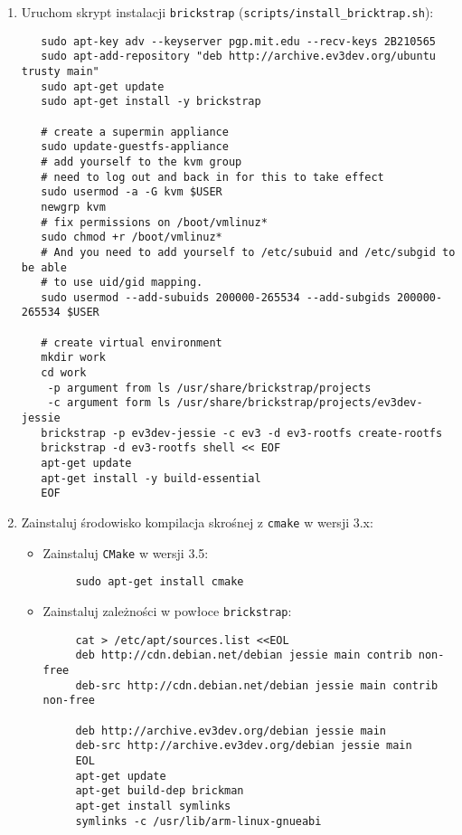 \documentclass{article}
\begin{document}
\begin{enumerate}
\def\labelenumi{\arabic{enumi}.}
\item
  Uruchom skrypt instalacji \texttt{brickstrap}
  (\texttt{scripts/install\_bricktrap.sh}):\\
  \begin{verbatim}
   sudo apt-key adv --keyserver pgp.mit.edu --recv-keys 2B210565
   sudo apt-add-repository "deb http://archive.ev3dev.org/ubuntu trusty main"
   sudo apt-get update
   sudo apt-get install -y brickstrap

   # create a supermin appliance
   sudo update-guestfs-appliance
   # add yourself to the kvm group
   # need to log out and back in for this to take effect
   sudo usermod -a -G kvm $USER
   newgrp kvm
   # fix permissions on /boot/vmlinuz*
   sudo chmod +r /boot/vmlinuz*
   # And you need to add yourself to /etc/subuid and /etc/subgid to be able
   # to use uid/gid mapping.
   sudo usermod --add-subuids 200000-265534 --add-subgids 200000-265534 $USER

   # create virtual environment
   mkdir work
   cd work
    -p argument from ls /usr/share/brickstrap/projects
    -c argument form ls /usr/share/brickstrap/projects/ev3dev-jessie
   brickstrap -p ev3dev-jessie -c ev3 -d ev3-rootfs create-rootfs
   brickstrap -d ev3-rootfs shell << EOF
   apt-get update
   apt-get install -y build-essential
   EOF
  \end{verbatim}
\item
  Zainstaluj środowisko kompilacja skrośnej z \texttt{cmake} w wersji
  3.x:
  \begin{itemize}
  \item
    Zainstaluj \texttt{CMake} w wersji 3.5:
    \begin{verbatim}
     sudo apt-get install cmake
    \end{verbatim}
\item Zainstaluj zależności w powłoce \texttt{brickstrap}:
    \begin{verbatim}
     cat > /etc/apt/sources.list <<EOL
     deb http://cdn.debian.net/debian jessie main contrib non-free
     deb-src http://cdn.debian.net/debian jessie main contrib non-free

     deb http://archive.ev3dev.org/debian jessie main
     deb-src http://archive.ev3dev.org/debian jessie main
     EOL
     apt-get update
     apt-get build-dep brickman
     apt-get install symlinks
     symlinks -c /usr/lib/arm-linux-gnueabi
    \end{verbatim}


\end{itemize}
\end{enumerate}
\end{document}
